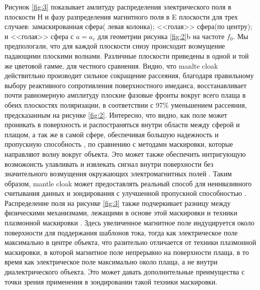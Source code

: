 \documentclass[12pt,a4paper]{article}
\begin{document}
Рисунок \ref{fig:3} показывает амлитуду распределения электрического поля в плоскости Н и
фазу разпределения магнитного поля в E плоскости для трех случаев: замаскированная сфера(
левая колонка); <<голая>> сфера(по центру); и <<голая>> сфера с $a=a_c$ для геометрии
рисунка \ref{fig:2}b на частоте $f_0$. Мы предпологали, что для каждой плоскости снизу
происходит возмущение падающими плоскими волнами. Различные плоскости приведены в одной и той
же цветовой гамме, для честного сравнения. Видно, что manlte cloak действитльно производит
сильное сокращение рассеяния, благодаря правильному выбору реактивного сопротивления 
поверхностного имеданса, восстанавливает почти равномерную амплитуду плоские фазовые фронты
вокруг всего плаща в обеих плоскостях поляризации, в соответствии с 97\% уменьшением
рассеяния, предсказанным на рисунке \ref{fig:2}. Интересно, что видно, как поле может
проникать в поверхность и распостраняться внутри области между сферой и плащом, а так же в 
самой сфере, обеспечивая большую надежность и пропускную способность \cite{12}, по сравнению
с методами маскировки, которые направляют волну вокруг объекта. Это может также обеспечить
интригующую возможонсть улавливать и извлекать сигнал внутри поверхности без значительного
возмущения окружающих электромагнитных полей \cite{16}. Таким образом, mantle cloak может
предоставлять реальный способ для неинвазивного считывания данных и зондирования с улучшенной
пропускной способностью \cite{17}. Распределение поля на рисунке \ref{fig:3} также 
подчеркивает разницу между физическими механизмами, лежащими в основе этой маскировки и
техники плазмонной маскировки \cite{8}. Здесь увеличенное магнитное поле индуцируется 
около поверхности для поддержания шаблонов тока, тогда как электрическое поле максимально в
центре объекта, что разительно отличается от техники плазмонной маскировки, в которой 
магнитное поле непрерывно на поверхности плаща, в то время как электрическое поле максимально
около плаща, а не внутри диалектрического объекта. Это может давать дополнительные 
преимущества с точки зрения применения в зондировании такой техники маскировки.
\end{document}

